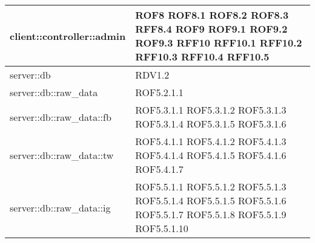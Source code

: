 \begin{center}
\begin{longtable}{| p{9cm} | p{4cm} |}
\hline
client::controller::admin  &  ROF8 \newline ROF8.1 \newline ROF8.2 \newline ROF8.3 \newline RFF8.4 \newline ROF9 \newline ROF9.1 \newline ROF9.2 \newline ROF9.3 \newline RFF10 \newline RFF10.1 \newline RFF10.2 \newline RFF10.3 \newline RFF10.4 \newline RFF10.5 \newline \\
\hline
server::db  & RDV1.2 \newline \\
\hline
server::db::raw\_data  &  ROF5.2.1.1 \newline \\
\hline
server::db::raw\_data::fb  & ROF5.3.1.1 \newline ROF5.3.1.2 \newline ROF5.3.1.3 \newline ROF5.3.1.4 \newline ROF5.3.1.5 \newline ROF5.3.1.6 \newline \\
\hline
server::db::raw\_data::tw  & ROF5.4.1.1 \newline ROF5.4.1.2 \newline ROF5.4.1.3 \newline ROF5.4.1.4 \newline ROF5.4.1.5 \newline ROF5.4.1.6  \newline ROF5.4.1.7 \newline \\
\hline
server::db::raw\_data::ig  & ROF5.5.1.1 \newline ROF5.5.1.2 \newline ROF5.5.1.3 \newline ROF5.5.1.4 \newline ROF5.5.1.5 \newline ROF5.5.1.6  \newline ROF5.5.1.7 \newline ROF5.5.1.8 \newline ROF5.5.1.9 \newline ROF5.5.1.10 \newline \\

\end{longtable}
\end{center}
